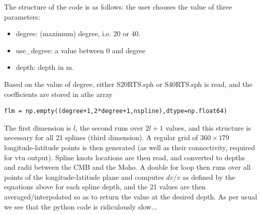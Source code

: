 The structure of the code is as follows: the user chooses the value of three parameters:
\begin{itemize}
\item {\codefont degree}: (maximum) degree, i.e. 20 or 40.
\item {\codefont use\_degree}: a value between 0 and {\codefont degree}
\item {\codefont depth}: depth in \si{m}.
\end{itemize}
Based on the value of {\codefont degree}, either {\filenamefont S20RTS.sph} or {\filenamefont S40RTS.sph} is read,
and the coefficients are stored in athe array
\begin{verbatim}
flm = np.empty((degree+1,2*degree+1,nspline),dtype=np.float64)
\end{verbatim}
The first dimension is $l$, the second runs over $2l+1$ values, and this structure is necessary for all 21 splines (third dimension).
A regular grid of $360\times 179$ longitude-latitude points is then generated (as well as their connectivity, required for vtu output).
Spline knots locations are then read, and converted to depths and radii between the CMB and the Moho.
A double for loop then runs over all points of the longitude-latitude plane and computes $dv/v$ as defined by the equations above 
for each spline depth, and the 21 values are then averaged/interpolated so as to return the value at the desired depth. 
As per usual we see that the python code is ridiculously slow...

